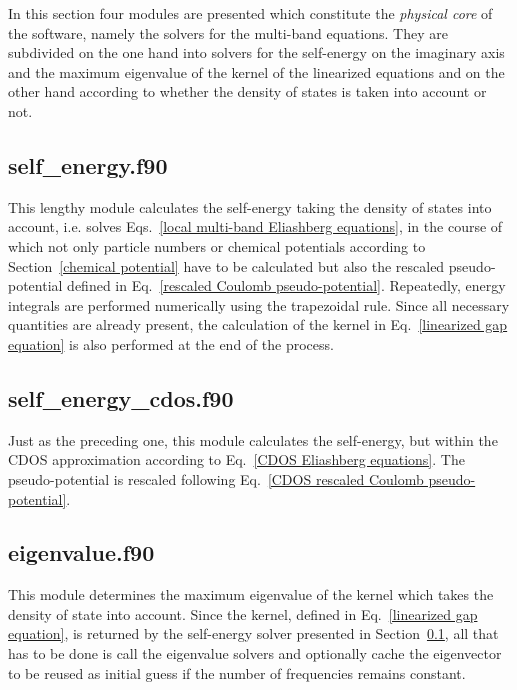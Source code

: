 In this section four modules are presented which constitute the \emph{physical
core} of the software, namely the solvers for the multi-band 
equations. They are subdivided on the one hand into solvers for the self-energy
on the imaginary axis and the maximum eigenvalue of the kernel of the linearized
equations and on the other hand according to whether the density of states is
taken into account or not.

\subsection{self\_energy.f90}
\label{self_energy.f90}

This lengthy module calculates the self-energy taking the density of states into
account, i.e. solves Eqs.~\ref{local multi-band Eliashberg equations}, in the
course of which not only particle numbers or chemical potentials according to
Section~\ref{chemical potential} have to be calculated but also the rescaled
 pseudo-potential defined in Eq.~\ref{rescaled Coulomb
pseudo-potential}. Repeatedly, energy integrals are performed numerically using
the trapezoidal rule. Since all necessary quantities are already present, the
calculation of the kernel in Eq.~\ref{linearized gap equation} is also performed
at the end of the process.



\subsection{self\_energy\_cdos.f90}

Just as the preceding one, this module calculates the self-energy, but within
the CDOS approximation according to Eq.~\ref{CDOS Eliashberg equations}. The
 pseudo-potential is rescaled following Eq.~\ref{CDOS rescaled
Coulomb pseudo-potential}.



\subsection{eigenvalue.f90}

This module determines the maximum eigenvalue of the  kernel
which takes the density of state into account. Since the kernel, defined in
Eq.~\ref{linearized gap equation}, is returned by the self-energy solver
presented in Section~\ref{self_energy.f90}, all that has to be done is call the
eigenvalue solvers and optionally cache the eigenvector to be reused as initial
guess if the number of  frequencies remains constant.

